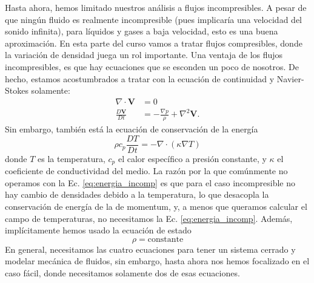 Hasta ahora, hemos limitado nuestros análisis a flujos incompresibles.
A pesar de que ningún fluido es realmente incompresible (pues implicaría una velocidad del sonido infinita), para líquidos y gases a baja velocidad, esto es una buena aproximación.
En esta parte del curso vamos a tratar flujos compresibles, donde la variación de densidad juega un rol importante.
Una ventaja de los flujos incompresibles, es que hay ecuaciones que se esconden un poco de nosotros.
De hecho, estamos acostumbrados a tratar con la ecuación de continuidad y Navier-Stokes solamente:
%
\begin{align}\label{eq:incompresible}
\nabla\cdot\mathbf{V} &= 0\nonumber\\
\frac{D\mathbf{V}}{D t} &=-\frac{\nabla p}{\rho} +\nabla^2\mathbf{V}.
\end{align}
%
Sin embargo, también está la ecuación de conservación de la energía
%
\begin{equation}\label{eq:energia_incomp}
\rho c_p\frac{DT}{Dt} = -\nabla\cdot (\kappa\nabla T)
\end{equation}
%
donde $T$ es la temperatura, $c_p$ el calor específico a presión constante, y $\kappa$ el coeficiente de conductividad del medio.
La razón por la que comúnmente no operamos con la Ec. \eqref{eq:energia_incomp} es que para el caso incompresible no hay cambio de densidades debido a la temperatura, lo que desacopla la conservación de energía de la de momentum, y, a menos que queramos calcular el campo de temperaturas, no necesitamos la Ec. \eqref{eq:energia_incomp}.
Además, implícitamente hemos usado la ecuación de estado
%
\begin{equation}\label{eq:estado_incomp}
\rho = \text{constante}
\end{equation}
%
En general, necesitamos las cuatro ecuaciones para tener un sistema cerrado y modelar mecánica de fluidos, sin embargo, hasta ahora nos hemos focalizado en el caso fácil, donde necesitamos solamente dos de esas ecuaciones.

